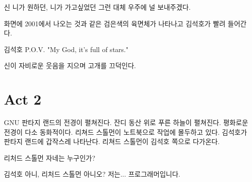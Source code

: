 \documentclass{screenplay}
\begin{document}
    \begin{dialogue}{신}
        니가 원하던, 니가 가고싶었던 그런 대체 우주에 널 보내주겠다.
    \end{dialogue}
    
    화면에 2001에서 나오는 것과 같은 검은색의 육면체가 나타나고 김석호가 빨려 들어간다.
    
    \begin{dialogue}{김석호}
        P.O.V. "My God, it's full of stars."
    \end{dialogue}
    
    신이 자비로운 웃음을 지으며 고개를 끄덕인다.
    
    \fadeout
    
    \section*{Act 2}
    
    \fadein
    
    
    GNU 판타지 랜드의 전경이 펼쳐진다. 잔디 동산 위로 푸른 하늘이 펼쳐진다. 평화로운 전경이 다소 동화적이다. 리쳐드 스톨먼이 노트북으로 작업에 몰두하고 있다. 김석호가 판타지 랜드에 갑작스레 나타난다. 리쳐드 스톨먼이 김석호 쪽으로 다가온다.
    
    \begin{dialogue}{리처드 스톨먼}
        자네는 누구인가?
    \end{dialogue}
    
    \begin{dialogue}{김석호}
        아니, 리처드 스톨먼 아니오? 저는... 프로그래머입니다.
    \end{dialogue}
\end{document}
